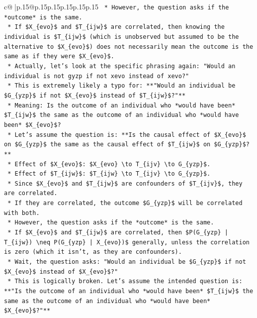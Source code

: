 \documentclass{article}
\begin{document}
{\begin{supertabular}{c@{$\;$}|p{.15\linewidth}@{}p{.15\linewidth}p{.15\linewidth}p{.15\linewidth}p{.15\linewidth}p{.15\linewidth}}
{{{\texttt{    *   However, the question asks if the *outcome* is the same.} \\
\texttt{    *   If \$X\_\{evo\}\$ and \$T\_\{ijw\}\$ are correlated, then knowing the individual is \$T\_\{ijw\}\$ (which is unobserved but assumed to be the alternative to \$X\_\{evo\}\$) does not necessarily mean the outcome is the same as if they were \$X\_\{evo\}\$.} \\
\texttt{    *   Actually, let's look at the specific phrasing again: "Would an individual is not gyzp if not xevo instead of xevo?"} \\
\texttt{    *   This is extremely likely a typo for: **"Would an individual be \$G\_\{yzp\}\$ if not \$X\_\{evo\}\$ instead of \$T\_\{ijw\}\$?"**} \\
\texttt{    *   Meaning: Is the outcome of an individual who *would have been* \$T\_\{ijw\}\$ the same as the outcome of an individual who *would have been* \$X\_\{evo\}\$?} \\
\texttt{    *   Let's assume the question is: **Is the causal effect of \$X\_\{evo\}\$ on \$G\_\{yzp\}\$ the same as the causal effect of \$T\_\{ijw\}\$ on \$G\_\{yzp\}\$?**} \\
\texttt{        *   Effect of \$X\_\{evo\}\$: \$X\_\{evo\} \textbackslash{}to T\_\{ijv\} \textbackslash{}to G\_\{yzp\}\$.} \\
\texttt{        *   Effect of \$T\_\{ijw\}\$: \$T\_\{ijw\} \textbackslash{}to T\_\{ijv\} \textbackslash{}to G\_\{yzp\}\$.} \\
\texttt{        *   Since \$X\_\{evo\}\$ and \$T\_\{ijw\}\$ are confounders of \$T\_\{ijv\}\$, they are correlated.} \\
\texttt{        *   If they are correlated, the outcome \$G\_\{yzp\}\$ will be correlated with both.} \\
\texttt{        *   However, the question asks if the *outcome* is the same.} \\
\texttt{        *   If \$X\_\{evo\}\$ and \$T\_\{ijw\}\$ are correlated, then \$P(G\_\{yzp\} | T\_\{ijw\}) \textbackslash{}neq P(G\_\{yzp\} | X\_\{evo\})\$ generally, unless the correlation is zero (which it isn't, as they are confounders).} \\
\texttt{        *   Wait, the question asks: "Would an individual be \$G\_\{yzp\}\$ if not \$X\_\{evo\}\$ instead of \$X\_\{evo\}\$?"} \\
\texttt{        *   This is logically broken. Let's assume the intended question is: **"Is the outcome of an individual who *would have been* \$T\_\{ijw\}\$ the same as the outcome of an individual who *would have been* \$X\_\{evo\}\$?"**} \\
}}}
\end{supertabular}}
\end{document}
